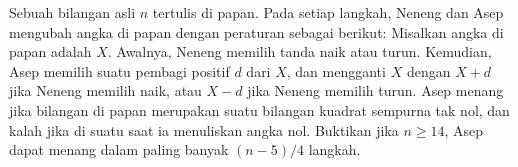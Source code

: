 Sebuah bilangan asli $n$ tertulis di papan. Pada setiap langkah, Neneng dan Asep mengubah angka di papan dengan peraturan sebagai berikut: Misalkan angka di papan adalah $X$. Awalnya, Neneng memilih tanda naik atau turun. Kemudian, Asep memilih suatu pembagi positif $d$ dari $X$, dan mengganti $X$ dengan $X+d$ jika Neneng memilih naik, atau $X-d$ jika Neneng memilih turun. Asep menang jika bilangan di papan merupakan suatu bilangan kuadrat sempurna tak nol, dan kalah jika di suatu saat ia menuliskan angka nol. Buktikan jika $n \ge 14$, Asep dapat menang dalam paling banyak $(n-5)/4$ langkah.